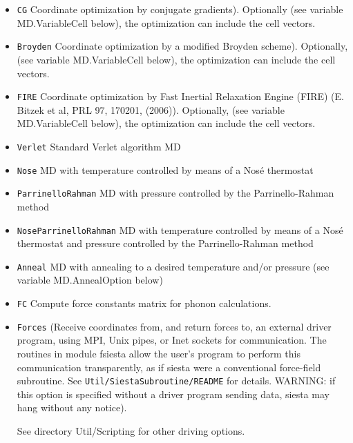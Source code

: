 \begin{itemize}

\item \texttt{CG} Coordinate optimization by conjugate
  gradients). Optionally (see variable MD.VariableCell below), the
  optimization can include the cell vectors.

\item \texttt{Broyden} Coordinate optimization by a modified Broyden
  scheme). Optionally, (see variable MD.VariableCell below), the
  optimization can include the cell vectors.

\item \texttt{FIRE} Coordinate optimization by Fast Inertial Relaxation
  Engine (FIRE) (E. Bitzek et al, PRL 97, 170201, (2006)).
  Optionally, (see variable MD.VariableCell below), the
  optimization can include the cell vectors.

\item \texttt{Verlet} Standard Verlet algorithm MD

\item \texttt{Nose}  MD with temperature controlled  by means of a Nos\'e
thermostat

\item \texttt{ParrinelloRahman}  MD with pressure controlled by
the Parrinello-Rahman method

\item \texttt{NoseParrinelloRahman}  MD with temperature controlled
by means of a Nos\'e thermostat and pressure controlled by
the Parrinello-Rahman method

\item \texttt{Anneal}  MD with annealing to a desired
temperature and/or pressure (see variable MD.AnnealOption below)

\item \texttt{FC} Compute force constants matrix for phonon calculations.


\item \texttt{Forces} (Receive coordinates from, and return forces to, an
  external driver program, using MPI, Unix pipes, or Inet sockets for 
  communication.
  The routines in module fsiesta allow the user's program to perform
  this communication transparently, as if siesta were a conventional
  force-field subroutine. See \texttt{Util/SiestaSubroutine/README} for
  details. WARNING: if this option is specified without a driver
  program sending data, siesta may hang without any notice).

See directory Util/Scripting  for other driving options.

\end{itemize}

